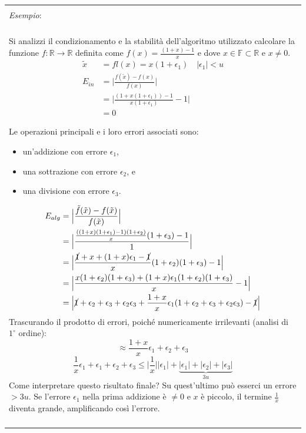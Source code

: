 \documentclass{article}
\numberwithin{equation}{section}
\newenvironment{example}
{\begin{center}
        \begin{tabular}{|p{0.9\textwidth}|}
            \hline \\ 
            \textit{Esempio}: \\\\ 
        }
        {
            \\\\ \hline
        \end{tabular}
    \end{center}
}
\begin{document}
\begin{example}
   Si analizzi il condizionamento e la stabilità dell'algoritmo utilizzato calcolare la funzione $f:\mathbb{R}\rightarrow
   \mathbb{R}$ definita come $f(x)=\frac{(1+x)-1}{x}$ e dove $x\in
   \mathbb{F}\subset \mathbb{R}\text{ e }x\neq0$.
   \begin{equation*}
        \begin{aligned}
           \tilde{x}&=fl(x)=x(1+\epsilon_1) & \lvert\epsilon_1\rvert < u \\
           E_{in}&=\Big\lvert \frac{f(\tilde{x})-f(x)}{f(x)}\Big\rvert\\ 
                 &=\Big\lvert
                 \frac{(1+x(1+\epsilon_1))-1}{x(1+\epsilon_1)}-1\Big\rvert\\ 
                 &=0
       \end{aligned} 
   \end{equation*}
    
   Le operazioni principali e i loro errori associati sono:
   \begin{itemize}
        \item un'addizione con errore $\epsilon_1$,
        \item una sottrazione con errore $\epsilon_2$, e
        \item una divisione con errore $\epsilon_3$.
   \end{itemize}

   \begin{equation*}
       \begin{aligned}
           E_{alg}&=\Big\lvert\frac{\tilde{f}(\tilde{x})-f(\tilde{x})}{f(\tilde{x})}\Big\rvert\\ 
                  &=\Big\lvert
                  \frac{\frac{((1+x)(1+\epsilon_1)-1)(1+\epsilon_2)}{x}(1+\epsilon_3)-1}{1}\Big\rvert\\ 
                  &=\Big\lvert
                  \frac{\cancel{1}+x+(1+x)\epsilon_1-\cancel{1}}{x}(1+\epsilon_2)(1+\epsilon_3)-1\Big\rvert\\ 
                  &=\Big\lvert
                  \frac{x(1+\epsilon_2)(1+\epsilon_3)+(1+x)\epsilon_1(1+\epsilon_2)(1+\epsilon_3)}{x}-1\Big\rvert\\ 
                  &=\Big\lvert
                  \cancel{1}+\epsilon_2+\epsilon_3+\epsilon_2\epsilon_3+\frac{1+x}{x}\epsilon_1(1+\epsilon_2+\epsilon_3+\epsilon_2\epsilon_3)-\cancel{1}\Big\rvert
       \end{aligned}
   \end{equation*}
   Trascurando il prodotto di errori, poiché numericamente irrilevanti
   (analisi di $1^{\circ}$ ordine):
   $$\approx \frac{1+x}{x}\epsilon_1+\epsilon_2+\epsilon_3$$
   $$\frac{1}{x}\epsilon_1+\epsilon_1+\epsilon_2+\epsilon_3\leq \Big\lvert
   \frac{1}{x}\Big\rvert \lvert \epsilon_1\rvert + \underbrace{\lvert \epsilon_1\rvert +
\lvert \epsilon_2\rvert + \lvert \epsilon_3\rvert}_{3u}$$
    Come interpretare questo risultato finale? Su quest'ultimo può esserci un
    errore $>3u$. Se l'errore $\epsilon_1$ nella prima addizione è $\neq0$ e
    $x$ è piccolo, il termine $\frac{1}{x}$ diventa grande, amplificando così
    l'errore.
\end{example}
\end{document}
